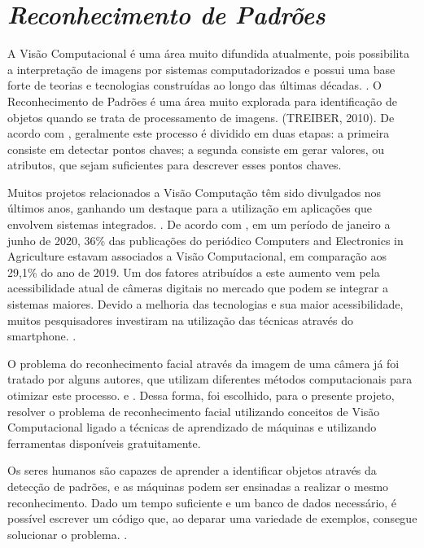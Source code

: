 \section{\textit{Reconhecimento de Padrões}}\label{sec:Cap2_RP}

A Visão Computacional é uma área muito difundida atualmente, pois possibilita a interpretação de imagens por sistemas computadorizados e possui uma base forte de teorias e tecnologias construídas ao longo das últimas décadas. \cite{MAIA10}. O Reconhecimento de Padrões é uma área muito explorada para identificação de objetos quando se trata de processamento de imagens. (TREIBER, 2010). De acordo com \cite{SILVA12}, geralmente este processo é dividido em duas etapas: a primeira consiste em detectar pontos chaves; a segunda consiste em gerar valores, ou atributos, que sejam suficientes para descrever esses pontos chaves.

Muitos projetos relacionados a Visão Computação têm sido divulgados nos últimos anos, ganhando um destaque para a utilização em aplicações que envolvem sistemas integrados. \cite{JESUS19}. De acordo com \cite{santos2020visao}, em um período de janeiro a junho de 2020, 36\% das publicações do periódico Computers and Electronics in Agriculture estavam associados a Visão Computacional, em comparação aos 29,1\% do ano de 2019. Um dos fatores atribuídos a este aumento vem pela acessibilidade atual de câmeras digitais no mercado que podem se integrar a sistemas maiores. Devido a melhoria das tecnologias e sua maior acessibilidade, muitos pesquisadores investiram na utilização das técnicas através do smartphone. \cite{canez2017proposta}.

O problema do reconhecimento facial através da imagem de uma câmera já foi tratado por alguns autores, que utilizam diferentes métodos computacionais para otimizar este processo. \cite{okabe2015reconhecimento} e \cite{maia2016detecccao}. Dessa forma, foi escolhido, para o presente projeto, resolver o problema de reconhecimento facial utilizando conceitos de Visão Computacional ligado a técnicas de aprendizado de máquinas e utilizando ferramentas disponíveis gratuitamente.

Os seres humanos são capazes de aprender a identificar objetos através da detecção de padrões, e as máquinas podem ser ensinadas a realizar o mesmo reconhecimento. Dado um tempo suficiente e um banco de dados necessário, é possível escrever um código que, ao deparar uma variedade de exemplos, consegue solucionar o problema. \cite{shukla18}.

